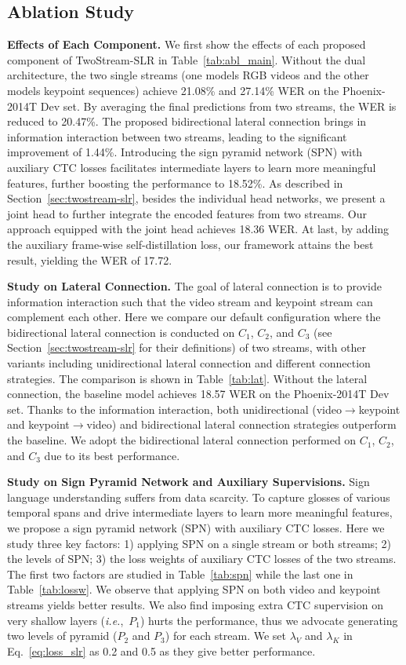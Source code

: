 \documentclass{article}
\def\ie{\emph{i.e.}} \def\Ie{\emph{I.e.}}
\begin{document}
\subsection{Ablation Study}
\label{sec:ablation}
\textbf{Effects of Each Component.} We first show the effects of each proposed component of TwoStream-SLR in Table~\ref{tab:abl_main}. Without the dual architecture, the two single streams (one models RGB videos and the other models keypoint sequences) achieve 21.08\% and 27.14\% WER on the Phoenix-2014T Dev set. By averaging the final predictions from two streams, the WER is reduced to 20.47\%. The proposed bidirectional lateral connection brings in information interaction between two streams, leading to the significant improvement of 1.44\%. Introducing the sign pyramid network (SPN) with auxiliary CTC losses facilitates intermediate layers to learn more meaningful features, further boosting the performance to 18.52\%. As described in Section~\ref{sec:twostream-slr}, besides the individual head networks, we present a joint head to further integrate the encoded features from two streams. Our approach equipped with the joint head achieves 18.36 WER. At last, by adding the auxiliary frame-wise self-distillation loss, our framework attains the best result, yielding the WER of 17.72. 

\textbf{Study on Lateral Connection.} 
The goal of lateral connection is to provide information interaction such that the video stream and keypoint stream can complement each other. Here we compare our default configuration where the bidirectional lateral connection is conducted on $C_1$, $C_2$, and $C_3$ (see Section~\ref{sec:twostream-slr} for their definitions) of two streams, with other variants including unidirectional lateral connection and different connection strategies. The comparison is shown in Table~\ref{tab:lat}. Without the lateral connection, the baseline model achieves 18.57 WER on the Phoenix-2014T Dev set. Thanks to the information interaction, both unidirectional (video$\to$keypoint and keypoint$\to$video) and bidirectional lateral connection strategies outperform the baseline. We adopt the bidirectional lateral connection performed on $C_1$, $C_2$, and $C_3$ due to its best performance.


\textbf{Study on Sign Pyramid Network and Auxiliary Supervisions.}
Sign language understanding suffers from data scarcity. To capture glosses of various temporal spans and drive intermediate layers to learn more meaningful features, we propose a sign pyramid network (SPN) with auxiliary CTC losses. Here we study three key factors: 1) applying SPN on a single stream or both streams; 2) the levels of SPN; 3) the loss weights of auxiliary CTC losses of the two streams. The first two factors are studied in Table~\ref{tab:spn} while the last one in Table~\ref{tab:lossw}. We observe that applying SPN on both video and keypoint streams yields better results. We also find imposing extra CTC supervision on very shallow layers (\ie,~$P_1$) hurts the performance, thus we advocate generating two levels of pyramid ($P_2$ and $P_3$) for each stream. We set $\lambda_{V}$ and $\lambda_{K}$ in Eq.~\ref{eq:loss_slr} as 0.2 and 0.5 as they give better performance. 
\end{document}
